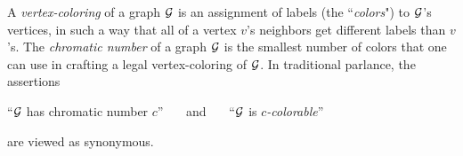
 
A {\it vertex-coloring} of a graph $\mbox{$\cal G$}$ is an assignment of labels (the ``{\em colors}") to $\mbox{$\cal G$}$'s vertices,  in such a way that all of a vertex $v$'s neighbors get different labels than $v$'s.  The {\it chromatic number} of a graph $\mbox{$\cal G$}$ is the smallest number of colors that one can use in crafting a legal vertex-coloring of $\mbox{$\cal G$}$.  In traditional parlance, the assertions

\smallskip

``$\mbox{$\cal G$}$ has chromatic number $c$'' \ \ \ and \ \ \  ``$\mbox{$\cal G$}$ is {\it $c$-colorable}''


\smallskip

\noindent
are viewed as synonymous.


\bigskip


